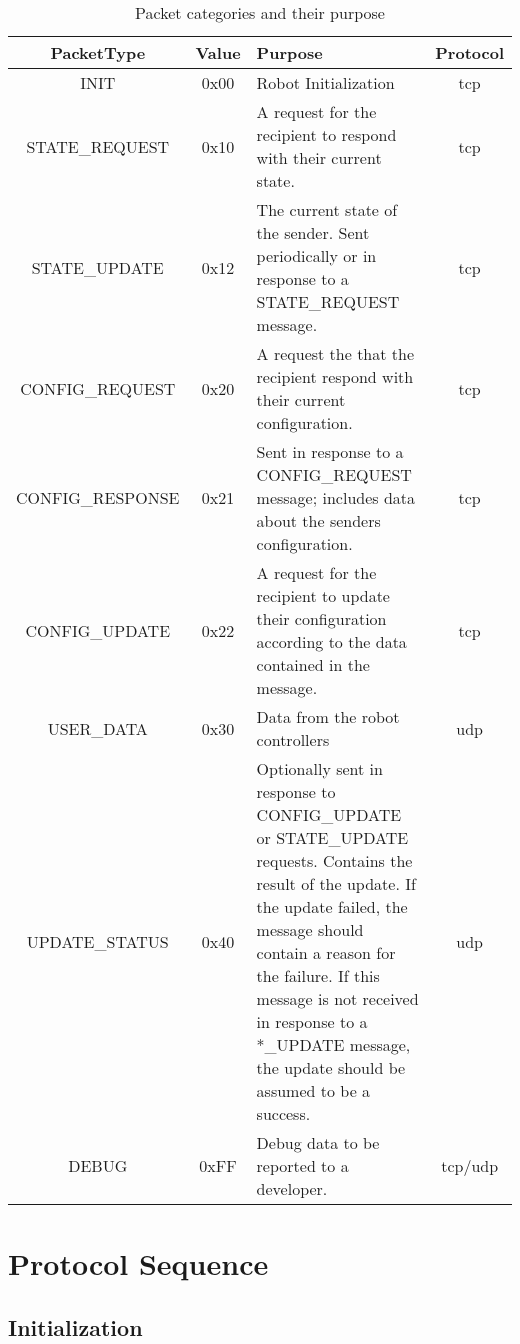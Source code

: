 \documentclass[11pt]{article}
\begin{document}
\begin{table}[h!]
    \centering
    \caption{Packet categories and their purpose}
    \label{tab:pktTypes}
    \begin{tabular}{|c|c|p{3in}|c|}
        \hline
        PacketType & Value & Purpose & Protocol \\ 
        \hline
        INIT & 0x00 & Robot Initialization & \acrshort{tcp} \\ 
        \hline
        STATE\_REQUEST & 0x10 & A request for the recipient to respond with their current state. & \acrshort{tcp} \\
        \hline
        STATE\_UPDATE & 0x12 & The current state of the sender. 
        Sent periodically or in response to a STATE\_REQUEST message. & \acrshort{tcp} \\
        \hline
        CONFIG\_REQUEST & 0x20 & A request the that the recipient respond with their current configuration. & \acrshort{tcp} \\
        \hline
        CONFIG\_RESPONSE & 0x21 & Sent in response to a CONFIG\_REQUEST message; 
            includes data about the senders configuration. & \acrshort{tcp} \\
        \hline
        CONFIG\_UPDATE & 0x22 & A request for the recipient to update their configuration according to the data contained 
            in the message. & \acrshort{tcp} \\
        \hline
        USER\_DATA & 0x30 & Data from the robot controllers & \acrshort{udp} \\
        \hline
        UPDATE\_STATUS & 0x40 & Optionally sent in response to CONFIG\_UPDATE or STATE\_UPDATE requests.
        Contains the result of the update.  If the update failed, the message should contain a reason for the failure.
        If this message is not received in response to a *\_UPDATE message, the update should be assumed to be a success.
        & \acrshort{udp} \\
        \hline
        DEBUG & 0xFF & Debug data to be reported to a developer. & \acrshort{tcp}/\acrshort{udp} \\
        \hline
    \end{tabular}
\end{table}

\section {Protocol Sequence}
\subsection{Initialization}
\end{document}
